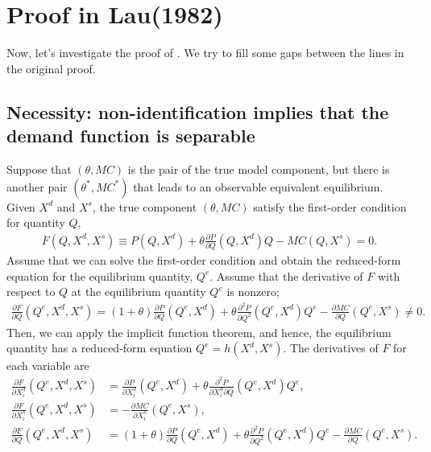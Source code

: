 \documentclass[11pt, a4paper]{article}
\theoremstyle{remark}
\begin{document}
\section{Proof in Lau(1982)}\label{sec:proof_lau}
Now, let's investigate the proof of \citet{lau1982identifying}.
We try to fill some gaps between the lines in the original proof.






\subsection{Necessity: non-identification implies that the demand function is separable}

Suppose that $(\theta, MC)$ is the pair of the true model component, but there is another pair $(\theta^{*}, MC^{*})$ that leads to an observable equivalent equilibrium.
Given $X^{d}$ and $X^{s}$, the true component $(\theta, MC)$ satisfy the first-order condition for quantity $Q$,
\begin{align}
    F(Q, X^{d}, X^{s}) \equiv P(Q, X^{d}) + \theta\frac{\partial P}{\partial Q}(Q, X^{d})Q - MC(Q, X^{s}) = 0.
\end{align}
Assume that we can solve the first-order condition and obtain the reduced-form equation for the equilibrium quantity, $Q^e$.
Assume that the derivative of $F$ with respect to $Q$ at the equilibrium quantity $Q^e$ is nonzero;
\begin{align}
    \frac{\partial F}{\partial Q}(Q^e, X^{d}, X^{s}) = (1+\theta)\frac{\partial P}{\partial Q}(Q^e, X^{d}) + \theta\frac{\partial^2 P}{\partial Q^2}(Q^e, X^{d})Q^e - \frac{\partial MC}{\partial Q}(Q^e, X^{s}) \ne 0.
\end{align}
Then, we can apply the implicit function theorem, and hence, the equilibrium quantity has a reduced-form equation $Q^e = h(X^{d}, X^{s})$.
The derivatives of $F$ for each variable are
\begin{align}
    \frac{\partial F}{\partial X^{d}_i}(Q^e, X^{d}, X^{s}) & =  \frac{\partial P}{\partial X^{d}_{i}}(Q^e, X^{d}) + \theta\frac{\partial^2 P}{\partial X^{d}_{i}\partial Q}(Q^e, X^{d})Q^e,\\
    \frac{\partial F}{\partial X^{s}_i}(Q^e, X^{d}, X^{s}) & =  -\frac{\partial MC}{\partial X^{s}_{i}}(Q^e, X^{s}),\\
    \frac{\partial F}{\partial Q}(Q^e, X^{d}, X^{s}) & = (1+\theta)\frac{\partial P}{\partial Q}(Q^e, X^{d}) + \theta\frac{\partial^2 P}{\partial Q^2}(Q^e, X^{d})Q^e - \frac{\partial MC}{\partial Q}(Q^e, X^{s}).
\end{align}
\end{document}

